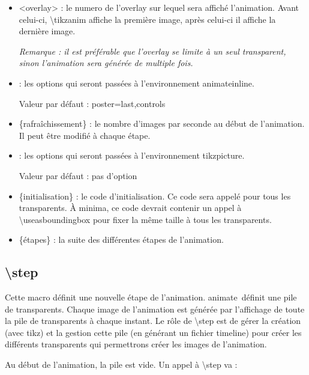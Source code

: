 \documentclass[a4paper,12pt]{article}
\newcommand\Tikz{{\ttfamily tikz}}
\newcommand\Animate{{\ttfamily animate}}
\begin{document}
	\begin{itemize}
		\item {\ttfamily <overlay>} : le numero de l'{\ttfamily overlay} sur lequel sera affiché l'animation. Avant celui-ci, {\ttfamily\textbackslash tikzanim} affiche la première image, après celui-ci il affiche la dernière image. 
		
		\emph{Remarque : il est préférable que l'{\ttfamily overlay} se limite à un seul transparent, sinon l'animation sera générée de multiple
		fois.}
		\item {} : les options qui seront passées à l'environnement {\ttfamily animateinline}.
		
		Valeur par défaut : {\ttfamily poster=last,controls}
		\item {\ttfamily \{rafraîchissement\}} : le nombre d'images par seconde au début de l'animation. Il peut être modifié à chaque étape.
		\item {} : les options qui seront passées à l'environnement {\ttfamily tikzpicture}.
		
		Valeur par défaut : pas d'option
		\item {\ttfamily \{initialisation\}} : le code d'initialisation. Ce code sera appelé pour tous les transparents. À minima, ce code devrait contenir un appel à {\ttfamily\textbackslash useasboundingbox} pour fixer la même taille à tous les transparents.
		\item {\ttfamily \{étapes\}} : la suite des différentes étapes de l'animation. 
	\end{itemize}
	
\subsection{\ttfamily\textbackslash step}

	Cette macro définit une nouvelle étape de l'animation. \Animate\ définit une pile de transparents. Chaque image de l'animation est générée par l'affichage 
	de toute la pile de transparents à chaque instant. Le rôle de {\ttfamily\textbackslash step} est de gérer la création (avec \Tikz) et la gestion cette pile
	(en générant un fichier timeline) pour créer les différents transparents qui permettrons créer les images de l'animation.
		
	Au début de l'animation, la pile est vide. Un appel à {\ttfamily\textbackslash step} va :
	
\end{document}
